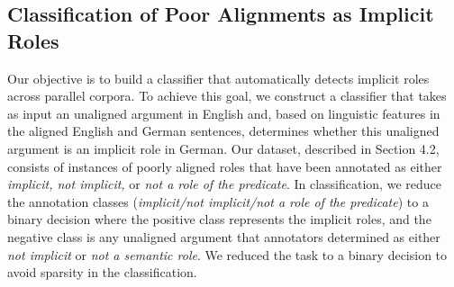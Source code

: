 \documentclass[11pt]{article}
\begin{document}
\subsection{Classification of Poor Alignments as Implicit Roles}
Our objective is to build a classifier that automatically detects implicit roles across parallel corpora. To achieve this goal, we construct a classifier that takes as input an unaligned argument in English and, based on linguistic features in the aligned English and German sentences, determines whether this unaligned argument is an implicit role in German. Our dataset, described in Section 4.2, consists of instances of poorly aligned roles that have been annotated as either \textit{implicit, not implicit,} or \textit{not a role of the predicate}. In classification, we reduce the annotation classes (\textit{implicit/not implicit/not a role of the predicate}) to a binary decision where the positive class represents the implicit roles, and the negative class is any unaligned argument that annotators determined as either \textit{not implicit} or \textit{not a semantic role}. We reduced the task to a binary decision to avoid sparsity in the classification.
\end{document}
